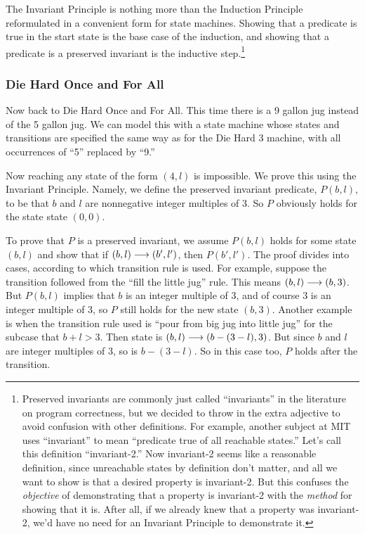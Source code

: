 The Invariant Principle is nothing more than the Induction Principle
reformulated in a convenient form for state machines.  Showing that a
predicate is true in the start state is the base case of the induction,
and showing that a predicate is a preserved invariant is the inductive
step.\footnote{Preserved invariants are commonly just called
  ``invariants'' in the literature on program correctness, but we decided
  to throw in the extra adjective to avoid confusion with other
  definitions.  For example, another subject at MIT uses ``invariant'' to
  mean ``predicate true of all reachable states.''  Let's call this
  definition ``invariant-2.''  Now invariant-2 seems like a reasonable
  definition, since unreachable states by definition don't matter, and all
  we want to show is that a desired property is invariant-2.  But this
  confuses the \emph{objective} of demonstrating that a property is
  invariant-2 with the \emph{method} for showing that it is.  After all,
  if we already knew that a property was invariant-2, we'd have no need
  for an Invariant Principle to demonstrate it.}

\subsubsection{Die Hard Once and For All}

Now back to Die Hard Once and For All.  This time there is a 9 gallon jug
instead of the 5 gallon jug.  We can model this with a state machine whose
states and transitions are specified the same way as for the Die Hard 3
machine, with all occurrences of ``5'' replaced by ``9.''

Now reaching any state of the form $(4,l)$ is impossible.  We prove this
using the Invariant Principle.  Namely, we define the preserved invariant
predicate, $P(b,l)$, to be that $b$ and $l$ are nonnegative integer
multiples of 3.  So $P$ obviously holds for the state state $(0,0)$.

To prove that $P$ is a preserved invariant, we assume $P(b,l)$ holds for
some state $(b,l)$ and show that if $(b,l) \mathrel{\longrightarrow} (b',l')$, then
$P(b',l')$.  The proof divides into cases, according to which transition
rule is used.  For example, suppose the transition followed from the
``fill the little jug'' rule.  This means $(b,l) \mathrel{\longrightarrow} (b,3)$.  But
$P(b,l)$ implies that $b$ is an integer multiple of 3, and of course 3 is
an integer multiple of 3, so $P$ still holds for the new state $(b,3)$.
Another example is when the transition rule used is ``pour from big jug
into little jug'' for the subcase that $b + l > 3$.  Then state is $(b,l)
\mathrel{\longrightarrow} (b -( 3 -l), 3)$.  But since $b$ and $l$ are integer multiples of
3, so is $b -( 3 -l)$.  So in this case too, $P$ holds after the
transition.

